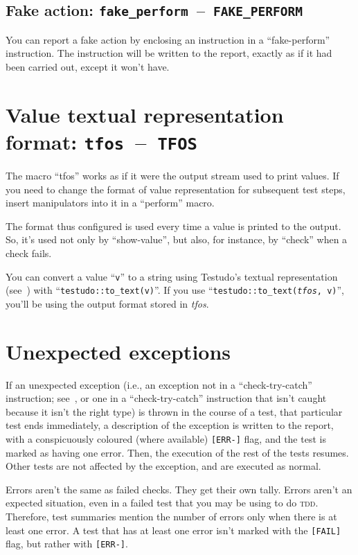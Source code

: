 \documentclass[twoside, a4paper, article]{memoir}
\newcommand*\testudocolor{\color{red!80!blue}}
\newcommand*\testudo[1]{\texttt{\testudocolor{}#1}}
\newcommand*\testudopair[2]{\testudo{#1}~--~\testudo{#2}}
\newcommand\sectiontestudopair[3]{%
  \section[#1]{#1: \testudopair{#2}{#3}}}
\newcommand\subsectiontestudopair[3]{%
  \subsection[#1]{#1: \testudopair{#2}{#3}}}
\providecommand\typesetexample[1]{%
}
\begin{document}
\typesetexample{fake-declare}


\subsectiontestudopair{Fake action}{fake\_perform}{FAKE\_PERFORM}
\label{sec:fake-action}

You can report a fake action by enclosing an instruction in a ``fake-perform''
instruction.  The instruction will be written to the report, exactly as if it
had been carried out, except it won't have.

\typesetexample{fake-perform}


\sectiontestudopair{Value textual representation format}%
  {tfos}{TFOS}
\label{sec:value-textual-representation-format}

The macro ``tfos'' works as if it were the output stream used to print values.
If you need to change the format of value representation for subsequent test
steps, insert manipulators into it in a ``perform'' macro.

\typesetexample{tfos}

The format thus configured is used every time a value is printed to the output.
So, it's used not only by ``show-value'', but also, for instance, by ``check''
when a check fails.

You can convert a value ``\texttt{v}'' to a string using Testudo's textual
representation (see~) with
``\texttt{testudo::to\_text(v)}''.  If you use
``\texttt{testudo::to\_text(\textit{tfos}, v)}'', you'll be using the output
format stored in \emph{tfos}.

\typesetexample{tfos-to-text}


\section{Unexpected exceptions}
\label{sec:unexpected-exceptions}

If an unexpected exception (i.e., an exception not in a ``check-try-catch''
instruction; see~, or one in a ``check-try-catch''
instruction that isn't caught because it isn't the right type) is thrown in the
course of a test, that particular test ends immediately, a description of the
exception is written to the report, with a conspicuously coloured (where
available) \verb|[ERR-]| flag, and the test is marked as having one error.
Then, the execution of the rest of the tests resumes.  Other tests are not
affected by the exception, and are executed as normal.

Errors aren't the same as failed checks.  They get their own tally.  Errors
aren't an expected situation, even in a failed test that you may be using to do
\textsc{tdd}.  Therefore, test summaries mention the number of errors only
when there is at least one error.  A test that has at least one error isn't
marked with the \verb|[FAIL]| flag, but rather with \verb|[ERR-]|.
\end{document}
